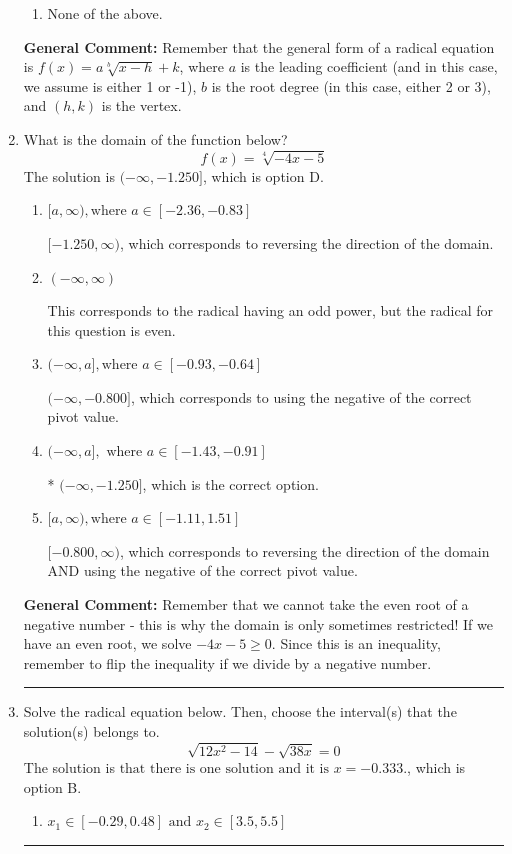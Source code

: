 \documentclass{extbook}[14pt]
\newcommand{\litem}[1]{\item #1

\rule{\textwidth}{0.4pt}}
\begin{document}
\begin{enumerate}
{\begin{enumerate}[label=\Alph*.]
\begin{multicols}{2}
\end{multicols}\item None of the above.\end{enumerate}
\textbf{General Comment:} Remember that the general form of a radical equation is $ f(x) = a \sqrt[b]{x - h} + k $, where $a$ is the leading coefficient (and in this case, we assume is either 1 or -1), $b$ is the root degree (in this case, either 2 or 3), and $(h, k)$ is the vertex.
}
\litem{
What is the domain of the function below?
\[ f(x) = \sqrt[4]{-4 x - 5} \]The solution is \( (-\infty, -1.250] \), which is option D.\begin{enumerate}[label=\Alph*.]
\item \( [a, \infty), \text{where } a \in [-2.36, -0.83] \)

 $[-1.250, \infty)$, which corresponds to reversing the direction of the domain.
\item \( (-\infty, \infty) \)

This corresponds to the radical having an odd power, but the radical for this question is even.
\item \( (-\infty, a], \text{where } a \in [-0.93, -0.64] \)

$(-\infty, -0.800]$, which corresponds to using the negative of the correct pivot value.
\item \( (-\infty, a], \text{ where } a \in [-1.43, -0.91] \)

* $(-\infty, -1.250]$, which is the correct option.
\item \( [a, \infty), \text{where } a \in [-1.11, 1.51] \)

$[-0.800, \infty)$, which corresponds to reversing the direction of the domain AND using the negative of the correct pivot value.
\end{enumerate}

\textbf{General Comment:} Remember that we cannot take the even root of a negative number - this is why the domain is only sometimes restricted! If we have an even root, we solve $-4 x - 5 \geq 0$. Since this is an inequality, remember to flip the inequality if we divide by a negative number.
}
\litem{
Solve the radical equation below. Then, choose the interval(s) that the solution(s) belongs to.
\[ \sqrt{12 x^2 - 14} - \sqrt{38 x} = 0 \]The solution is \( \text{that there is one solution and it is } x = -0.333. \), which is option B.\begin{enumerate}[label=\Alph*.]
\item \( x_1 \in [-0.29, 0.48] \text{ and } x_2 \in [3.5,5.5] \)


\end{enumerate}}
\end{enumerate}
\end{document}

